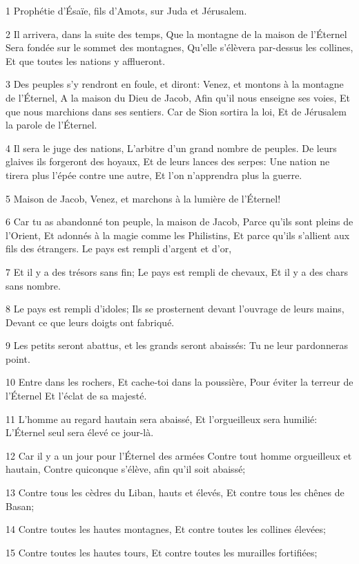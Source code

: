 \par 1 Prophétie d'Ésaïe, fils d'Amots, sur Juda et Jérusalem.
\par 2 Il arrivera, dans la suite des temps, Que la montagne de la maison de l'Éternel Sera fondée sur le sommet des montagnes, Qu'elle s'élèvera par-dessus les collines, Et que toutes les nations y afflueront.
\par 3 Des peuples s'y rendront en foule, et diront: Venez, et montons à la montagne de l'Éternel, A la maison du Dieu de Jacob, Afin qu'il nous enseigne ses voies, Et que nous marchions dans ses sentiers. Car de Sion sortira la loi, Et de Jérusalem la parole de l'Éternel.
\par 4 Il sera le juge des nations, L'arbitre d'un grand nombre de peuples. De leurs glaives ils forgeront des hoyaux, Et de leurs lances des serpes: Une nation ne tirera plus l'épée contre une autre, Et l'on n'apprendra plus la guerre.
\par 5 Maison de Jacob, Venez, et marchons à la lumière de l'Éternel!
\par 6 Car tu as abandonné ton peuple, la maison de Jacob, Parce qu'ils sont pleins de l'Orient, Et adonnés à la magie comme les Philistins, Et parce qu'ils s'allient aux fils des étrangers. Le pays est rempli d'argent et d'or,
\par 7 Et il y a des trésors sans fin; Le pays est rempli de chevaux, Et il y a des chars sans nombre.
\par 8 Le pays est rempli d'idoles; Ils se prosternent devant l'ouvrage de leurs mains, Devant ce que leurs doigts ont fabriqué.
\par 9 Les petits seront abattus, et les grands seront abaissés: Tu ne leur pardonneras point.
\par 10 Entre dans les rochers, Et cache-toi dans la poussière, Pour éviter la terreur de l'Éternel Et l'éclat de sa majesté.
\par 11 L'homme au regard hautain sera abaissé, Et l'orgueilleux sera humilié: L'Éternel seul sera élevé ce jour-là.
\par 12 Car il y a un jour pour l'Éternel des armées Contre tout homme orgueilleux et hautain, Contre quiconque s'élève, afin qu'il soit abaissé;
\par 13 Contre tous les cèdres du Liban, hauts et élevés, Et contre tous les chênes de Basan;
\par 14 Contre toutes les hautes montagnes, Et contre toutes les collines élevées;
\par 15 Contre toutes les hautes tours, Et contre toutes les murailles fortifiées;
